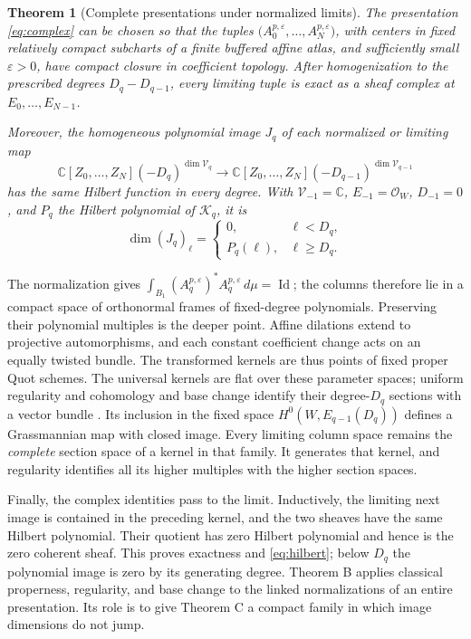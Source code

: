 \documentclass[11pt,reqno]{amsart}
\newtheorem{theorem}{Theorem}
\theoremstyle{remark}
\newcommand{\C}{\mathbb C}
\newcommand{\cO}{\mathcal O}
\newcommand{\cK}{\mathscr K}
\newcommand{\eps}{\varepsilon}
\DeclareMathOperator{\Id}{Id}
\begin{document}
\begin{theorem}[Complete presentations under normalized limits]
\label{thm:compact}
The presentation \eqref{eq:complex} can be chosen so that the tuples
$\bigl(A_0^{p,\eps},\ldots,A_N^{p,\eps}\bigr)$, with centers in
fixed relatively compact subcharts of a finite buffered affine atlas,
and sufficiently small $\eps>0$,
have compact closure in coefficient topology. After homogenization
to the prescribed degrees $D_q-D_{q-1}$, every limiting tuple is
exact as a sheaf complex at $E_0,\ldots,E_{N-1}$.

Moreover, the homogeneous polynomial image $J_q$ of each normalized
or limiting map
\[
 \C[Z_0,\ldots,Z_N](-D_q)^{\dim\mathcal V_q}
 \longrightarrow
 \C[Z_0,\ldots,Z_N](-D_{q-1})^{\dim\mathcal V_{q-1}}
\]
has the same Hilbert function in every degree. With $\mathcal V_{-1}=\C$,
$E_{-1}=\cO_W$, $D_{-1}=0$, and $P_q$ the Hilbert polynomial of
$\cK_q$, it is
\begin{equation}\label{eq:hilbert}
 \dim(J_q)_\ell=
 \begin{cases}0,&\ell<D_q,\\ P_q(\ell),&\ell\ge D_q.\end{cases}
\end{equation}
\end{theorem}

The normalization gives $\int_{B_1}(A_q^{p,\eps})^*A_q^{p,\eps}\,d\mu=\Id$;
the columns therefore lie in a compact space of orthonormal frames of
fixed-degree polynomials. Preserving their polynomial multiples is
the deeper point. Affine dilations extend to projective automorphisms, and each
constant coefficient change acts on an equally twisted bundle.
The transformed kernels are thus points of fixed proper Quot
schemes. The universal kernels are flat over these parameter spaces;
uniform regularity and cohomology and base change identify their
degree-$D_q$ sections with a vector bundle \cite{Stacks,Conrad}.
Its inclusion in the fixed space
$H^0(W,E_{q-1}(D_q))$ defines a Grassmannian map with closed image.
Every limiting column space remains the \emph{complete} section
space of a kernel in that family. It generates that kernel, and
regularity identifies all its higher multiples with the higher
section spaces.


Finally, the complex identities pass to the limit. Inductively, the
limiting next image is contained in the preceding kernel, and the
two sheaves have the same Hilbert polynomial. Their quotient has
zero Hilbert polynomial and hence is the zero coherent sheaf.
This proves exactness and \eqref{eq:hilbert}; below $D_q$ the
polynomial image is zero by its generating degree. Theorem B applies
classical properness, regularity, and base change to the linked
normalizations of an entire presentation. Its role is to give
Theorem C a compact family in which image dimensions do not jump.
\end{document}

